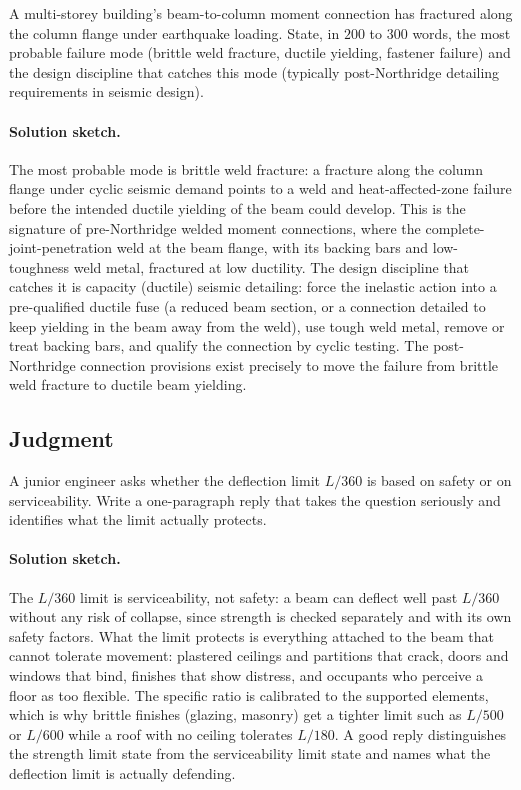 \begin{exercise}
A multi-storey building's beam-to-column moment connection has
fractured along the column flange under earthquake loading. State,
in $200$ to $300$ words, the most probable failure mode (brittle
weld fracture, ductile yielding, fastener failure) and the design
discipline that catches this mode (typically post-Northridge
detailing requirements in seismic design).

\paragraph{Solution sketch.} The most probable mode is brittle weld
fracture: a fracture along the column flange under cyclic seismic
demand points to a weld and heat-affected-zone failure before the
intended ductile yielding of the beam could develop. This is the
signature of pre-Northridge welded moment connections, where the
complete-joint-penetration weld at the beam flange, with its backing
bars and low-toughness weld metal, fractured at low ductility. The
design discipline that catches it is capacity (ductile) seismic
detailing: force the inelastic action into a pre-qualified ductile
fuse (a reduced beam section, or a connection detailed to keep yielding
in the beam away from the weld), use tough weld metal, remove or treat
backing bars, and qualify the connection by cyclic testing. The
post-Northridge connection provisions exist precisely to move the
failure from brittle weld fracture to ductile beam yielding.
\end{exercise}

\subsection*{Judgment}

\begin{exercise}
A junior engineer asks whether the deflection limit $L/360$ is
based on safety or on serviceability. Write a one-paragraph reply
that takes the question seriously and identifies what the limit
actually protects.

\paragraph{Solution sketch.} The $L/360$ limit is serviceability, not
safety: a beam can deflect well past $L/360$ without any risk of
collapse, since strength is checked separately and with its own safety
factors. What the limit protects is everything attached to the beam
that cannot tolerate movement: plastered ceilings and partitions that
crack, doors and windows that bind, finishes that show distress, and
occupants who perceive a floor as too flexible. The specific ratio is
calibrated to the supported elements, which is why brittle finishes
(glazing, masonry) get a tighter limit such as $L/500$ or $L/600$ while
a roof with no ceiling tolerates $L/180$. A good reply distinguishes the
strength limit state from the serviceability limit state and names what
the deflection limit is actually defending.
\end{exercise}

